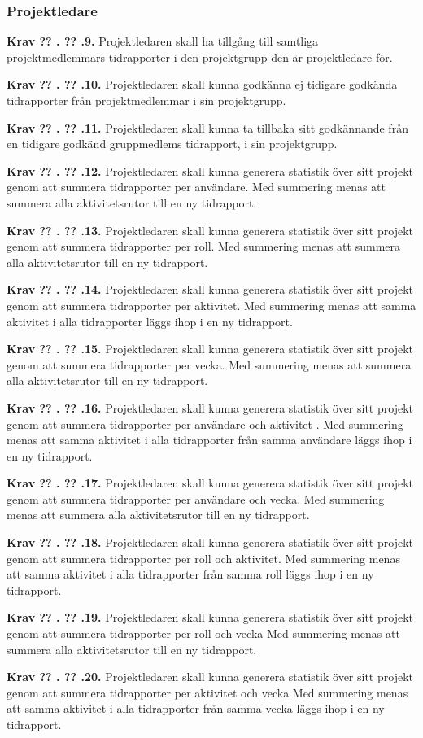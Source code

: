 \documentclass[a4paper]{article}
\newcommand\getcurrentref[1]{%
 \ifnumequal{\value{#1}}{0}
  {??}
  {\the\value{#1}}%
}
\newcommand\requirement[2]{
	\numberedrow{Krav}{#1}{#2}
}
\newcommand\numberedrow[3]{
	\noindent
	\textbf{#1 \getcurrentref{section}.\getcurrentref{subsection}.#2.} #3
	
}
\begin{document}
		\subsubsection*{Projektledare}
			\requirement{9}{Projektledaren skall ha tillgång till samtliga projektmedlemmars tidrapporter i den projektgrupp den är projektledare för.}
			\requirement{10}{Projektledaren skall kunna godkänna ej tidigare godkända tidrapporter från projektmedlemmar i sin projektgrupp.}
			\requirement{11}{Projektledaren skall kunna ta tillbaka sitt godkännande från en tidigare godkänd gruppmedlems tidrapport, i sin projektgrupp.}
			\requirement{12}{Projektledaren skall kunna generera statistik över sitt projekt genom att summera tidrapporter per användare. Med summering menas att summera alla aktivitetsrutor till en ny tidrapport.}
			\requirement{13}{Projektledaren skall kunna generera statistik över sitt projekt genom att summera tidrapporter per roll. Med summering menas att summera alla aktivitetsrutor till en ny tidrapport.}
			\requirement{14}{Projektledaren skall kunna generera statistik över sitt projekt genom att summera tidrapporter per aktivitet. Med summering menas att samma aktivitet i alla tidrapporter läggs ihop i en ny tidrapport.}
			\requirement{15}{Projektledaren skall kunna generera statistik över sitt projekt genom att summera tidrapporter per vecka. Med summering menas att summera alla aktivitetsrutor till en ny tidrapport.}
			\requirement{16}{Projektledaren skall kunna generera statistik över sitt projekt genom att summera tidrapporter per användare och aktivitet . Med summering menas att samma aktivitet i alla tidrapporter från samma användare läggs ihop i en ny tidrapport.}
			\requirement{17}{Projektledaren skall kunna generera statistik över sitt projekt genom att summera tidrapporter per användare och vecka. Med summering menas att summera alla aktivitetsrutor till en ny tidrapport.}
			\requirement{18}{Projektledaren skall kunna generera statistik över sitt projekt genom att summera tidrapporter per roll och aktivitet. Med summering menas att samma aktivitet i alla tidrapporter från samma roll läggs ihop i en ny tidrapport.}
			\requirement{19}{Projektledaren skall kunna generera statistik över sitt projekt genom att summera tidrapporter per roll och vecka Med summering menas att summera alla aktivitetsrutor till en ny tidrapport.}
			\requirement{20}{Projektledaren skall kunna generera statistik över sitt projekt genom att summera tidrapporter per aktivitet och vecka Med summering menas att samma aktivitet i alla tidrapporter från samma vecka läggs ihop i en ny tidrapport.}
\end{document}
